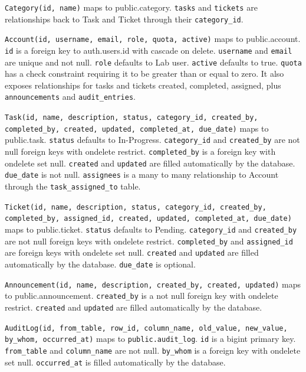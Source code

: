 \documentclass[12pt,letterpaper]{article}
\begin{document}
\texttt{Category(id, name)} maps to public.category. \texttt{tasks} and
\texttt{tickets} are relationships back to Task and Ticket through their
\texttt{category\_id}.

\texttt{Account(id, username, email, role, quota, active)} maps to
public.account. \texttt{id} is a foreign key to auth.users.id with cascade on
delete. \texttt{username} and \texttt{email} are unique and not null.
\texttt{role} defaults to Lab user. \texttt{active} defaults to true.
\texttt{quota} has a check constraint requiring it to be greater than or equal
to zero. It also exposes relationships for tasks and tickets created,
completed, assigned, plus \texttt{announcements} and \texttt{audit\_entries}.

\texttt{Task(id, name, description, status, category\_id, created\_by,
completed\_by, created, updated, completed\_at, due\_date)} maps to public.task.
\texttt{status} defaults to In-Progress. \texttt{category\_id} and
\texttt{created\_by} are not null foreign keys with ondelete restrict.
\texttt{completed\_by} is a foreign key with ondelete set null.
\texttt{created} and \texttt{updated} are filled automatically by the database.
\texttt{due\_date} is not null. \texttt{assignees} is a many to many
relationship to Account through the \texttt{task\_assigned\_to} table.

\texttt{Ticket(id, name, description, status, category\_id, created\_by,
completed\_by, assigned\_id, created, updated, completed\_at, due\_date)} maps
to public.ticket. \texttt{status} defaults to Pending. \texttt{category\_id}
and \texttt{created\_by} are not null foreign keys with ondelete restrict.
\texttt{completed\_by} and \texttt{assigned\_id} are foreign keys with ondelete
set null. \texttt{created} and \texttt{updated} are filled automatically by the
database. \texttt{due\_date} is optional.

\texttt{Announcement(id, name, description, created\_by, created, updated)}
maps to public.announcement. \texttt{created\_by} is a not null foreign key
with ondelete restrict. \texttt{created} and \texttt{updated} are filled
automatically by the database.

\texttt{AuditLog(id, from\_table, row\_id, column\_name, old\_value,
new\_value, by\_whom, occurred\_at)} maps to \texttt{public.audit\_log}.
\texttt{id} is a bigint primary key. \texttt{from\_table} and
\texttt{column\_name} are not null. \texttt{by\_whom} is a foreign key with
ondelete set null. \texttt{occurred\_at} is filled automatically by the
database.
\end{document}
